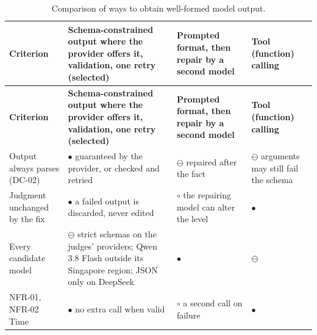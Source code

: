 {\small{}\renewcommand{\arraystretch}{1.1}
\begin{longtable}{|>{\raggedright\arraybackslash}p{}|>{\raggedright\arraybackslash}p{}|>{\raggedright\arraybackslash}p{}|>{\raggedright\arraybackslash}p{}|}
\caption{Comparison of ways to obtain well-formed model output.} \\
\hline
\textbf{Criterion} & \textbf{Schema-\allowbreak{}constrained output where the provider offers it, validation, one retry (selected)} & \textbf{Prompted format, then repair by a second model} & \textbf{Tool (function) calling} \\ \hline
\endfirsthead
\hline
\textbf{Criterion} & \textbf{Schema-\allowbreak{}constrained output where the provider offers it, validation, one retry (selected)} & \textbf{Prompted format, then repair by a second model} & \textbf{Tool (function) calling} \\ \hline
\endhead
Output always parses (DC-02) & $\bullet$ guaranteed by the provider, or checked and retried & $\ominus$ repaired after the fact & $\ominus$ arguments may still fail the schema \\ \hline
Judgment unchanged by the fix & $\bullet$ a failed output is discarded, never edited & $\circ$ the repairing model can alter the level & $\bullet$ \\ \hline
Every candidate model & $\ominus$ strict schemas on the judges' providers; Qwen 3.8 Flash outside its Singapore region\cite{r200}; JSON only on DeepSeek\cite{r201} & $\bullet$ & $\ominus$ \\ \hline
NFR-01, NFR-02 Time & $\bullet$ no extra call when valid & $\circ$ a second call on failure & $\bullet$ \\ \hline
\end{longtable}
}

